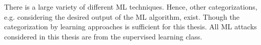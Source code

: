 There is a large variety of different \ac{ML} techniques.
Hence, other categorizations, e.g. considering the desired output of the \ac{ML} algorithm, exist.
Though the categorization by learning approaches is sufficient for this thesis.
All \ac{ML} attacks considered in this thesis are from the supervised learning class.







